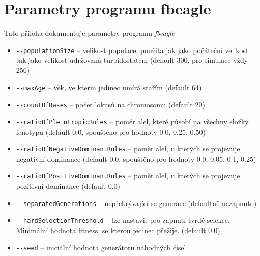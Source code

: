 \section{Parametry programu fbeagle}
\label{sec:parameters}

Tato příloha dokumentuje parametry programu \textit{fbeagle}

\begin{itemize}
  \item \texttt{-{}-populationSize} -- velikost populace, použita jak jako počáteční velikost tak jako velikost udržovaná turbidostatem (default 300, pro simulace vždy 256)
  \item \texttt{-{}-maxAge} -- věk, ve kterm jedinec umírá stařím (default 64)
  \item \texttt{-{}-countOfBases} -- počet lokusů na chromosomu (default 20)
  \item \texttt{-{}-ratioOfPleiotropicRules} -- poměr alel, které působí na všechny složky fenotypu (default 0.0, spouštěno pro hodnoty 0.0, 0.25, 0.50)
  \item \texttt{-{}-ratioOfNegativeDominantRules} -- poměr alel, u kterých se projevuje negativní dominance (default 0.0, spouštěno pro hodnoty 0.0, 0.05, 0.1, 0.25)
  \item \texttt{-{}-ratioOfPositiveDominantRules} -- poměr alel, u kterých se projevuje pozitivní dominance (default 0.0)
  \item \texttt{-{}-separatedGenerations} -- nepřekrývající se generace (defaultně nezapnuto)
  \item \texttt{-{}-hardSelectionThreshold} -- lze nastavit pro zapnutí tvrdé selekce. Minimální hodnota fitness, se kterou jedinec přežije. (default 0.0)
  \item \texttt{-{}-seed} -- iniciální hodnota generátoru náhodných čísel
\end{itemize}
